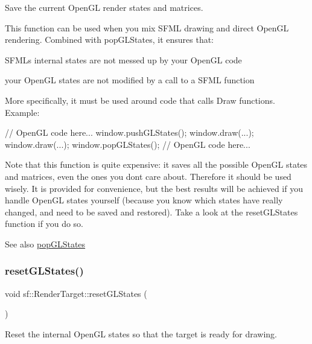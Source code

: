 Save the current Open\+GL render states and matrices. 

This function can be used when you mix S\+F\+ML drawing and direct Open\+GL rendering. Combined with pop\+G\+L\+States, it ensures that\+: \begin{DoxyItemize}
\item S\+F\+ML\textquotesingle{}s internal states are not messed up by your Open\+GL code \item your Open\+GL states are not modified by a call to a S\+F\+ML function\end{DoxyItemize}
More specifically, it must be used around code that calls Draw functions. Example\+: 
\begin{DoxyCode}
\textcolor{comment}{// OpenGL code here...}
window.pushGLStates();
window.draw(...);
window.draw(...);
window.popGLStates();
\textcolor{comment}{// OpenGL code here...}
\end{DoxyCode}


Note that this function is quite expensive\+: it saves all the possible Open\+GL states and matrices, even the ones you don\textquotesingle{}t care about. Therefore it should be used wisely. It is provided for convenience, but the best results will be achieved if you handle Open\+GL states yourself (because you know which states have really changed, and need to be saved and restored). Take a look at the reset\+G\+L\+States function if you do so.

\begin{DoxySeeAlso}{See also}
\hyperlink{classsf_1_1_render_target_ad5a98401113df931ddcd54c080f7aa8e}{pop\+G\+L\+States} 
\end{DoxySeeAlso}
\mbox{\label{classsf_1_1_render_target_aac7504990d27dada4bfe3c7866920765}} 
\subsubsection{\texorpdfstring{reset\+G\+L\+States()}{resetGLStates()}}
{\footnotesize\ttfamily void sf\+::\+Render\+Target\+::reset\+G\+L\+States (\begin{DoxyParamCaption}{ }\end{DoxyParamCaption})}



Reset the internal Open\+GL states so that the target is ready for drawing. 

